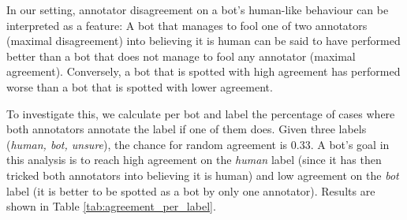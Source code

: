 \documentclass[11pt,a4paper]{article}
\begin{document}
In our setting, annotator disagreement on a bot's human-like behaviour can be interpreted as a feature: A bot that manages to fool one of two annotators (maximal disagreement) into believing it is human can be said to have performed better than a bot that does not manage to fool any annotator (maximal agreement). Conversely, a bot that is spotted with high agreement has performed worse than a bot that is spotted with lower agreement.



To investigate this, we calculate per bot and label the percentage of cases where both annotators annotate the label if one of them does. Given three labels (\emph{human, bot, unsure}), the chance for random agreement is 0.33. A bot's goal in this analysis is to reach high agreement on the \emph{human} label (since it has then tricked both annotators into believing it is human) and low agreement on the \emph{bot} label (it is better to be spotted as a bot by only one annotator). Results are shown in Table \ref{tab:agreement_per_label}.
\end{document}
